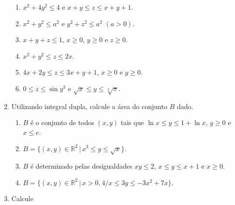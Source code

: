 \documentclass[11pt,a4paper]{article}
\begin{document}
\begin{enumerate}
\begin{enumerate}
			\item $x^2 + 4y^2 \leq 4$ e $x + y \leq z \leq x+y+1$.
			\item $x^2 + y^2 \leq a^2$ e $ y^2 + z^2 \leq a^2 \,\, (a > 0)$.
			
			\item $x+y+z \leq 1$, $x \geq 0$, $y \geq 0$ e $z \geq 0$.
			\item $x^2 + y^2 \leq z \leq 2x$.
			\item $4x + 2y \leq z \leq 3x + y + 1$, $x \geq 0$ e $y \geq 0$.
			\item $0 \leq z \leq \sin y^3$ e $\sqrt{x} \leq y \leq \sqrt[3]{\pi}$.
		\end{enumerate}
		
		\item Utilizando integral dupla, calcule a área do conjunto $B$ dado.
		
		\begin{enumerate}
			\item $B$ é o conjunto de todos $(x,y)$ tais que $\ln x \leq y \leq 1 + \ln x$, $y \geq 0$ e $x \leq e$.
			\item $B = \{(x,y) \in \mathbb{R}^2 \,|\, x^3 \leq y \leq \sqrt{x}\}$.
			\item $B$ é determinado pelas desigualdades $xy \leq 2$, $x \leq y \leq x + 1$ e $x \geq 0$.
			\item $B = \{(x,y) \in \mathbb{R}^2 \,|\, x > 0 \textrm{,}\ 4/x \leq 3y \leq -3x^2 + 7x \}$.
		\end{enumerate}
		
		\item Calcule
		

\end{enumerate}
\end{document}
